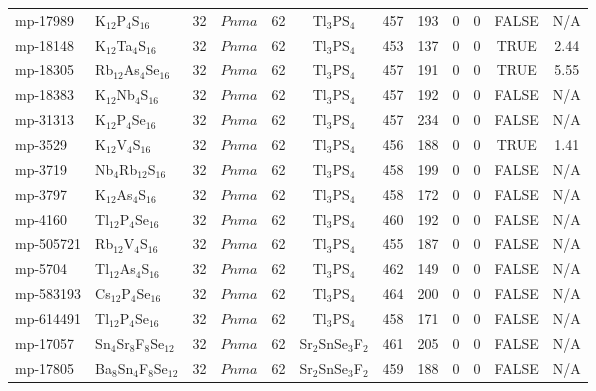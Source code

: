 {\begin{longtable}{llcccccccccc}
    mp-17989 & K$_{12}$P$_{4}$S$_{16}$ & 32    & $Pnma$ & 62    & Tl$_{3}$PS$_{4}$ & 457   & 193   & 0     & 0     & FALSE & N/A \\
    mp-18148 & K$_{12}$Ta$_{4}$S$_{16}$ & 32    & $Pnma$ & 62    & Tl$_{3}$PS$_{4}$ & 453   & 137   & 0     & 0     & TRUE  & 2.44  \\
    mp-18305 & Rb$_{12}$As$_{4}$Se$_{16}$ & 32    & $Pnma$ & 62    & Tl$_{3}$PS$_{4}$ & 457   & 191   & 0     & 0     & TRUE  & 5.55  \\
    mp-18383 & K$_{12}$Nb$_{4}$S$_{16}$ & 32    & $Pnma$ & 62    & Tl$_{3}$PS$_{4}$ & 457   & 192   & 0     & 0     & FALSE & N/A \\
    mp-31313 & K$_{12}$P$_{4}$Se$_{16}$ & 32    & $Pnma$ & 62    & Tl$_{3}$PS$_{4}$ & 457   & 234   & 0     & 0     & FALSE & N/A \\
    mp-3529 & K$_{12}$V$_{4}$S$_{16}$ & 32    & $Pnma$ & 62    & Tl$_{3}$PS$_{4}$ & 456   & 188   & 0     & 0     & TRUE  & 1.41  \\
    mp-3719 & Nb$_{4}$Rb$_{12}$S$_{16}$ & 32    & $Pnma$ & 62    & Tl$_{3}$PS$_{4}$ & 458   & 199   & 0     & 0     & FALSE & N/A \\
    mp-3797 & K$_{12}$As$_{4}$S$_{16}$ & 32    & $Pnma$ & 62    & Tl$_{3}$PS$_{4}$ & 458   & 172   & 0     & 0     & FALSE & N/A \\
    mp-4160 & Tl$_{12}$P$_{4}$Se$_{16}$ & 32    & $Pnma$ & 62    & Tl$_{3}$PS$_{4}$ & 460   & 192   & 0     & 0     & FALSE & N/A \\
    mp-505721 & Rb$_{12}$V$_{4}$S$_{16}$ & 32    & $Pnma$ & 62    & Tl$_{3}$PS$_{4}$ & 455   & 187   & 0     & 0     & FALSE & N/A \\
    mp-5704 & Tl$_{12}$As$_{4}$S$_{16}$ & 32    & $Pnma$ & 62    & Tl$_{3}$PS$_{4}$ & 462   & 149   & 0     & 0     & FALSE & N/A \\
    mp-583193 & Cs$_{12}$P$_{4}$Se$_{16}$ & 32    & $Pnma$ & 62    & Tl$_{3}$PS$_{4}$ & 464   & 200   & 0     & 0     & FALSE & N/A \\
    mp-614491 & Tl$_{12}$P$_{4}$Se$_{16}$ & 32    & $Pnma$ & 62    & Tl$_{3}$PS$_{4}$ & 458   & 171   & 0     & 0     & FALSE & N/A \\
    mp-17057 & Sn$_{4}$Sr$_{8}$F$_{8}$Se$_{12}$ & 32    & $Pnma$ & 62    & Sr$_{2}$SnSe$_{3}$F$_{2}$ & 461   & 205   & 0     & 0     & FALSE & N/A \\
    mp-17805 & Ba$_{8}$Sn$_{4}$F$_{8}$Se$_{12}$ & 32    & $Pnma$ & 62    & Sr$_{2}$SnSe$_{3}$F$_{2}$ & 459   & 188   & 0     & 0     & FALSE & N/A \\

\end{longtable}}

